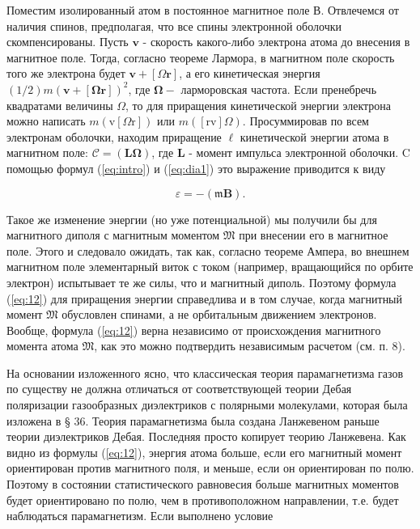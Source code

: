\documentclass[12pt]{article}
\begin{document}
  Поместим изолированный атом в постоянное магнитное поле В. Отвлечемся от наличия спинов, предполагая, что все спины электронной оболочки скомпенсированы. Пусть $\mathbf{v}$ - скорость какого-либо электрона атома до внесения в магнитное поле. Тогда, согласно теореме Лармора, в магнитном поле скорость того же электрона будет $\mathbf{v}+[\Omega \mathbf{r}]$, а его кинетическая энергия $(1 / 2) m(\mathbf{v}+[\boldsymbol{\Omega r}])^2$, где $\boldsymbol{\Omega}-$ ларморовская частота. Если пренебречь квадратами величины $\Omega$, то для приращения кинетической энергии электрона можно написать $m(\mathrm{v}[\Omega \mathrm{r}])$ или $m([\mathrm{rv}] \Omega)$. Просуммировав по всем электронам оболочки, находим приращение $\mathscr{\ell}$ кинетической энергии атома в магнитном поле: $\mathcal{C}=(\mathbf{L} \boldsymbol{\Omega})$, где $\mathbf{L}$ - момент импульса электронной оболочки. C помощью формул (\ref{eq:intro}) и (\ref{eq:dia1}) это выражение приводится к виду

  \begin{equation}
  \label{eq:12}
  \mathscr{\varepsilon}=-(\mathfrak{m} \mathbf{B}) .
  \end{equation}

  Такое же изменение энергии (но уже потенциальной) мы получили бы для магнитного диполя с магнитным моментом $\mathfrak{M}$ при внесении его в магнитное поле. Этого и следовало ожидать, так как, согласно теореме Ампера, во внешнем магнитном поле элементарный виток с током (например, вращающийся по орбите электрон) испытывает те же силы, что и магнитный диполь. Поэтому формула (\ref{eq:12}) для приращения энергии справедлива и в том случае, когда магнитный момент $\mathfrak{M}$ обусловлен спинами, а не орбитальным движением электронов. Вообще, формула (\ref{eq:12}) верна независимо от происхождения магнитного момента атома $\mathfrak{M}$, как это можно подтвердить независимым расчетом (см. п. 8).

  На основании изложенного ясно, что классическая теория парамагнетизма газов по существу не должна отличаться от соответствующей теории Дебая поляризации газообразных диэлектриков с полярными молекулами, которая была изложена в § 36. Теория парамагнетизма была создана Ланжевеном раньше теории диэлектриков Дебая. Последняя просто копирует теорию Ланжевена. Как видно из формулы (\ref{eq:12}), энергия атома больше, если его магнитный момент ориентирован против магнитного поля, и меньше, если он ориентирован по полю. Поэтому в состоянии статистического равновесия больше магнитных моментов будет ориентировано по полю, чем в противоположном направлении, т.е. будет наблюдаться парамагнетизм. Если выполнено условие
\end{document}
